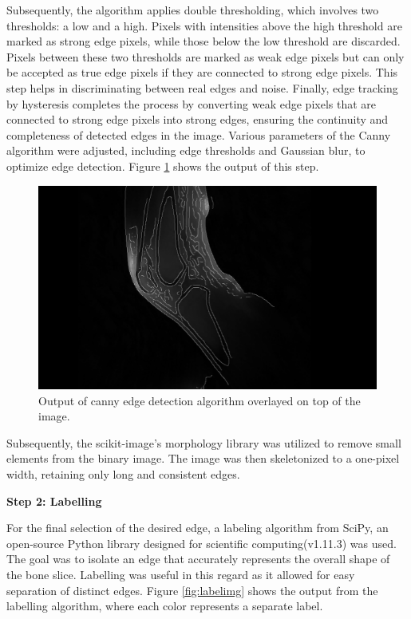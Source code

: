 \documentclass{micro-econ-thesis}
\begin{document}
Subsequently, the algorithm applies double thresholding, which involves two thresholds: a low and a high. Pixels with intensities above the high threshold are marked as strong edge pixels, while those below the low threshold are discarded. Pixels between these two thresholds are marked as weak edge pixels but can only be accepted as true edge pixels if they are connected to strong edge pixels. This step helps in discriminating between real edges and noise. Finally, edge tracking by hysteresis completes the process by converting weak edge pixels that are connected to strong edge pixels into strong edges, ensuring the continuity and completeness of detected edges in the image. Various parameters of the Canny algorithm were adjusted, including edge thresholds and Gaussian blur, to optimize edge detection. Figure \ref{fig:edgemitimg} shows the output of this step.  
\begin{figure}[H]
	\centering
	\includegraphics[width=0.7\linewidth]{edge_new}
	\caption{Output of canny edge detection algorithm overlayed on top of the image.}
	\label{fig:edgemitimg}
\end{figure}


Subsequently, the scikit-image's morphology library was utilized to remove small elements from the binary image. The image was then skeletonized to a one-pixel width, retaining only long and consistent edges. 

\textbf{Step 2: Labelling}

For the final selection of the desired edge, a labeling algorithm from SciPy, an open-source Python library designed for scientific computing(v1.11.3) was used. The goal was to isolate an edge that accurately represents the overall shape of the bone slice. Labelling was useful in this regard as it allowed for easy separation of distinct edges. Figure \ref{fig:labelimg} shows the output from the labelling algorithm, where each color represents a separate label. 
\end{document}
